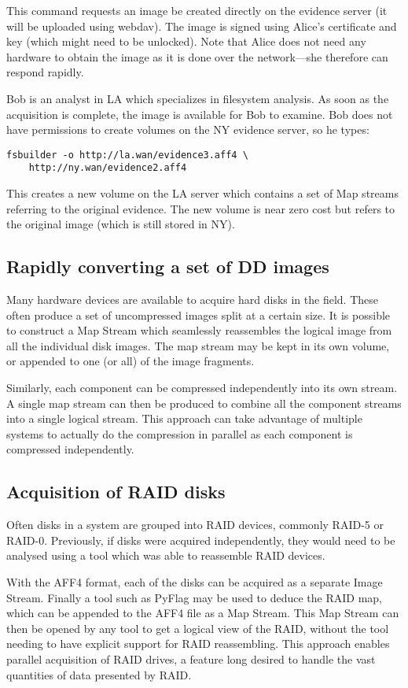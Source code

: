 \documentclass[10pt, conference]{IEEEtran}
\begin{document}
This command requests an image be created directly on the evidence
server (it will be uploaded using webdav). The image is signed using
Alice's certificate and key (which might need to be unlocked). Note
that Alice does not need any hardware to obtain the image as it is
done over the network---she therefore can respond rapidly.

Bob is an analyst in LA which specializes in filesystem analysis. As
soon as the acquisition is complete, the image is available for Bob to
examine. Bob does not have permissions to create volumes on the NY
evidence server, so he types:
\begin{lstlisting}
fsbuilder -o http://la.wan/evidence3.aff4 \
	http://ny.wan/evidence2.aff4
\end{lstlisting}
This creates a new volume on the LA server which contains a set of Map
streams referring to the original evidence. The new volume is near
zero cost but refers to the original image (which is still stored in
NY).

\subsection{Rapidly converting a set of DD images}
Many hardware devices are available to acquire hard disks in the
field. These often produce a set of uncompressed images split at a
certain size. It is possible to construct a Map Stream which
seamlessly reassembles the logical image from all the individual disk
images. The map stream may be kept in its own volume, or appended to
one (or all) of the image fragments.

Similarly, each component can be compressed independently into its own
stream. A single map stream can then be produced to combine all the
component streams into a single logical stream. This approach can take
advantage of multiple systems to actually do the compression in
parallel as each component is compressed independently.

\subsection{Acquisition of RAID disks}
Often disks in a system are grouped into RAID devices, commonly RAID-5
or RAID-0. Previously, if disks were acquired independently, they
would need to be analysed using a tool which was able to reassemble
RAID devices.

With the AFF4 format, each of the disks can be acquired as a separate
Image Stream. Finally a tool such as PyFlag \cite{pyflag_raid} may be
used to deduce the RAID map, which can be appended to the AFF4 file as
a Map Stream. This Map Stream can then be opened by any tool to get a
logical view of the RAID, without the tool needing to have explicit
support for RAID reassembling. This approach enables parallel
acquisition of RAID drives, a feature long desired to handle the vast
quantities of data presented by RAID.
\end{document}

